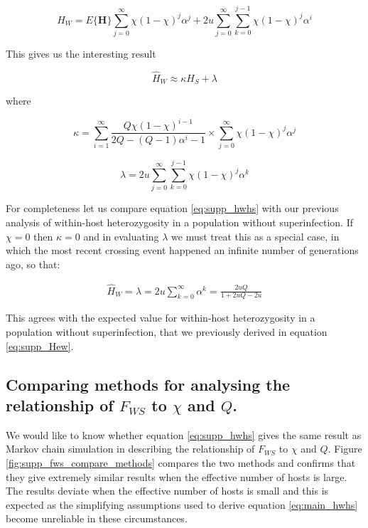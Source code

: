 \documentclass[_main.tex]{subfiles}
\begin{document}
\begin{equation}
\widehat{H}_W = E \{ \textbf{H} \} \sum_{j=0}^\infty \chi ( 1 - \chi )^j \alpha^j 
+ 
2u \sum_{j=0}^\infty \sum_{k=0}^{j-1}  \chi ( 1 - \chi )^j  \alpha^i
\end{equation}

This gives us the interesting result

\begin{equation}
\label{eq:supp_hwhs}
\widehat{H}_W \approx \kappa H_S + \lambda
\end{equation}

where

\begin{equation*}
\kappa =
\sum_{i=1}^\infty \frac{Q \chi (1-\chi)^{i-1}}{ 2Q - (Q-1) \alpha^i - 1}
\times
\sum_{j=0}^\infty \chi (1 - \chi)^j \alpha^j
\end{equation*}

\begin{equation*}
\lambda = 2u \sum_{j=0}^\infty \sum_{k=0}^{j-1}  \chi (1- \chi)^j \alpha^k
\end{equation*}

For completeness let us compare equation \ref{eq:supp_hwhs} with our previous analysis of within-host heterozygosity in a population without superinfection.  If $\chi=0$ then $\kappa =0$ and in evaluating $\lambda$ we must treat this as a special case, in which the most recent crossing event happened an infinite number of generations ago, so that:   

\begin{equation*}
\begin{aligned}
\widehat{H}_W = \lambda
= 2u \sum_{k=0}^\infty \alpha^k  = \frac{2uQ}{1 + 2uQ - 2u}
\end{aligned}
\end{equation*}

This agrees with the expected value for within-host heterozygosity in a population without superinfection, that we previously derived in equation \ref{eq:supp_Hew}.



\subsection{Comparing methods for analysing the relationship of \texorpdfstring{$F_{WS}$ to $\chi$ and $Q$}{Fws to chi and Q}.}
\label{supp_compare_methods}

We would like to know whether equation \ref{eq:supp_hwhs} gives the same result as Markov chain simulation in describing the relationship of $F_{WS}$ to $\chi$ and $Q$.  Figure \ref{fig:supp_fws_compare_methods} compares the two methods and confirms that they give extremely similar results when the effective number of hosts is large.  The results deviate when the effective number of hosts is small and this is expected as the simplifying assumptions used to derive equation \ref{eq:main_hwhs} become unreliable in these circumstances.
\end{document}
